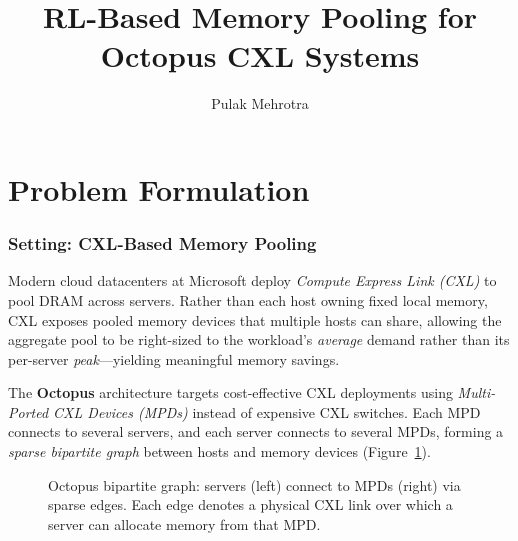 \documentclass[11pt]{article}
\title{RL-Based Memory Pooling for Octopus CXL Systems}
\author{Pulak Mehrotra}
\date{}
\begin{document}
\maketitle
\tableofcontents
\newpage

\section{Problem Formulation}

\subsubsection*{Setting: CXL-Based Memory Pooling}

Modern cloud datacenters at Microsoft deploy \emph{Compute Express Link (CXL)}
to pool DRAM across servers.  Rather than each host owning fixed local memory,
CXL exposes pooled memory devices that multiple hosts can share, allowing the
aggregate pool to be right-sized to the workload's \emph{average} demand
rather than its per-server \emph{peak}---yielding meaningful memory savings.

The \textbf{Octopus} architecture targets cost-effective CXL deployments using
\emph{Multi-Ported CXL Devices (MPDs)} instead of expensive CXL switches.
Each MPD connects to several servers, and each server connects to several MPDs,
forming a \emph{sparse bipartite graph} between hosts and memory devices
(Figure~\ref{fig:bipartite}).

\begin{figure}[H]
\centering
{}
\caption{Octopus bipartite graph: servers (left) connect to MPDs (right) via
sparse edges.  Each edge denotes a physical CXL link over which a server can
allocate memory from that MPD.}
\label{fig:bipartite}
\end{figure}
\end{document}
